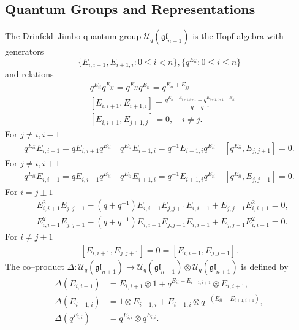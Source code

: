 \documentclass{ximera}
\begin{document}
\subsection{Quantum Groups and Representations}
The Drinfeld--Jimbo quantum group $\mathcal{U}_q(\mathfrak{gl}_{n+1})$ is the Hopf algebra with generators 
$$
\{E_{i,i+1},E_{i+1,i}: 0 \leq i < n\}, \{ q^{E_{ii}}: 0 \leq i \leq n\}
$$
and relations
\begin{align*}
& q^{E_{i i}} q^{E_{j j}}=q^{E_{j j}} q^{E_{i i}}=q^{E_{i i}+E_{j j}} \\ & \left[E_{i, i+1}, E_{i+1, i}\right]=\frac{q^{E_{i i}-E_{i+1, i+1}}-q^{E_{i+1, i+1}-E_{i i}}}{q-q^{-1}} \\& 
\left[E_{i, i+1}, E_{j+1, j}\right]=0, \quad i \neq j.
\end{align*}
For $j \neq i,i-1$
\begin{align*}
q^{E_{i i}} E_{i, i+1}=q E_{i, i+1} q^{E_{i i}} \quad q^{E_{i i}} E_{i-1, i}=q^{-1} E_{i-1, i} q^{E_{i i}} \quad\left[q^{E_{i i}}, E_{j, j+1}\right]=0.
\end{align*}
For $j \neq i,i+1$
\begin{align*}
q^{E_{i i}} E_{i, i-1}=q E_{i, i-1} q^{E_{i i}} \quad q^{E_{i i}} E_{i+1, i}=q^{-1} E_{i+1, i} q^{E_{i i}} \quad\left[q^{E_{i i}}, E_{j, j-1}\right]=0.
\end{align*}
For $i=j \pm 1$
\begin{align*}
 & E_{i, i+1}^{2} E_{j, j+1}-\left(q+q^{-1}\right) E_{i, i+1} E_{j, j+1} E_{i, i+1}+E_{j, j+1} E_{i, i+1}^{2}=0,
 \\
 & E_{i, i-1}^{2} E_{j, j-1}-\left(q+q^{-1}\right) E_{i, i-1} E_{j, j-1} E_{i, i-1}+E_{j, j-1} E_{i, i-1}^{2}=0.
 \end{align*}
 For $i \neq j \pm 1$
 \begin{align*}
 {\left[E_{i, i+1}, E_{j, j+1}\right]=0=\left[E_{i, i-1}, E_{j, j-1}\right] }.
\end{align*}
The co--product $\Delta: \mathcal{U}_q(\mathfrak{gl}_{n+1}) \to \mathcal{U}_q(\mathfrak{gl}_{n+1}) \otimes  \mathcal{U}_q(\mathfrak{gl}_{n+1})$ is defined by
\begin{align*}{}\Delta\left(E_{i, i+1}\right)&=E_{i, i+1} \otimes 1+q^{ E_{ii} - E_{i+1,i+1}} \otimes E_{i, i+1}, \\ \Delta\left(E_{i+1, i}\right)&=  1 \otimes E_{i+1, i}  + E_{i+1, i} \otimes q^{-(E_{ii}-E_{i+1,i+1}) },\\ \Delta\left(q^{E_{i, i}}\right)&=q^{E_{i, i}} \otimes q^{E_{i, i}}.\end{align*}
\end{document}
